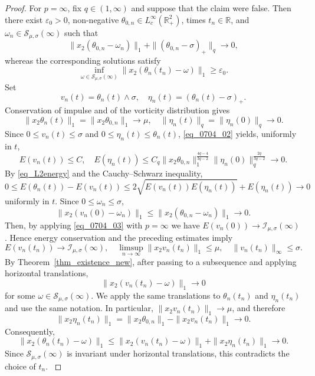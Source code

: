 \documentclass[11pt]{amsart}
\theoremstyle{definition}
\theoremstyle{definition}
\numberwithin{equation}{section}
\newcommand{\0}{\emptyset}
\newcommand{\bbR}{\mathbb R}
\newcommand{\calI}{\mathcal I}
\newcommand{\calS}{\mathcal S}
\begin{document}
\begin{proof}
                {
                For $p = \infty$, fix $q \in (1, \infty)$ and suppose that the claim were false.
                Then there exist $\varepsilon_0 > 0$, non-negative $\theta_{0,n} \in L^\infty_c(\mathbb{R}^2_+)$, times $t_n \in \bbR$, and $\omega_n \in \calS_{\mu,\sigma}(\infty)$ such that
                \[
                \|x_2(\theta_{0,n} - \omega_n)\|_1 + \|(\theta_{0,n} - \sigma)_+\|_q \to 0,
                \]
                whereas the corresponding solutions satisfy
                \[
                \inf_{\omega \in \calS_{\mu,\sigma}(\infty)} \|x_2(\theta_n(t_n) - \omega)\|_1 \ge \varepsilon_0.
                \]
                Set
                \[
                v_n(t) = \theta_n(t) \wedge \sigma, \quad \eta_n(t) = (\theta_n(t) - \sigma)_+.
                \]
                Conservation of impulse and of the vorticity distribution gives
                \[
                \|x_2\theta_n(t)\|_1 = \|x_2\theta_{0,n}\|_1 \to \mu, \quad \|\eta_n(t)\|_q = \|\eta_n(0)\|_q \to 0.
                \]
                Since $0 \le v_n(t) \le \sigma$ and $0 \le \eta_n(t) \le \theta_n(t)$, \eqref{eq_0704_02} yields, uniformly in $t$,
                \[
                E(v_n(t)) \le C, \quad E(\eta_n(t)) \le C_q \|x_2\theta_{0,n}\|_1^{\frac{4q-4}{3q-2}} \|\eta_n(0)\|_q^{\frac{2q}{3q-2}} \to 0.
                \]
                By \eqref{eq_L2energy} and the Cauchy--Schwarz inequality,
                \[
                0 \le E(\theta_n(t)) - E(v_n(t)) \le 2\sqrt{E(v_n(t)) E(\eta_n(t))} + E(\eta_n(t))\to 0
                \]
                uniformly in $t$.
                Since $0\le \omega_n \le \sigma$,
                \[
                \|x_2(v_n(0) - \omega_n)\|_1 \le \|x_2(\theta_{0,n} - \omega_n)\|_1 \to 0.
                \]
                Then, by applying \eqref{eq_0704_03} with $p=\infty$ we have $E(v_n(0)) \to \calI_{\mu,\sigma}(\infty)$.
                Hence energy conservation and the preceding estimates imply
                \[
                E(v_n(t_n))\to\calI_{\mu,\sigma}(\infty), \quad \limsup_{n\to\infty}\|x_2v_n(t_n)\|_1 \le \mu, \quad \|v_n(t_n)\|_\infty \le \sigma.
                \]
                By Theorem~\ref{thm_existence_new}, after passing to a subsequence and applying horizontal translations,
                \[
                \|x_2(v_n(t_n) - \omega) \|_1 \to 0
                \]
                for some $\omega \in \calS_{\mu,\sigma}(\infty)$.
                We apply the same translations to $\theta_n(t_n)$ and $\eta_n(t_n)$ and use the same notation.
                In particular, $\|x_2 v_n(t_n)\|_1 \to \mu$, and therefore
                \[
                \|x_2\eta_n(t_n)\|_1 = \|x_2\theta_{0,n}\|_1 - \|x_2 v_n(t_n)\|_1 \to 0.
                \]
                Consequently,
                \[
                \|x_2(\theta_n(t_n)-\omega)\|_1 \le \|x_2(v_n(t_n)-\omega)\|_1 + \|x_2\eta_n(t_n)\|_1 \to 0.
                \]
                Since $\calS_{\mu,\sigma}(\infty)$ is invariant under horizontal translations, this contradicts the choice of $t_n$.
                }
			\end{proof}
			
\end{document}
